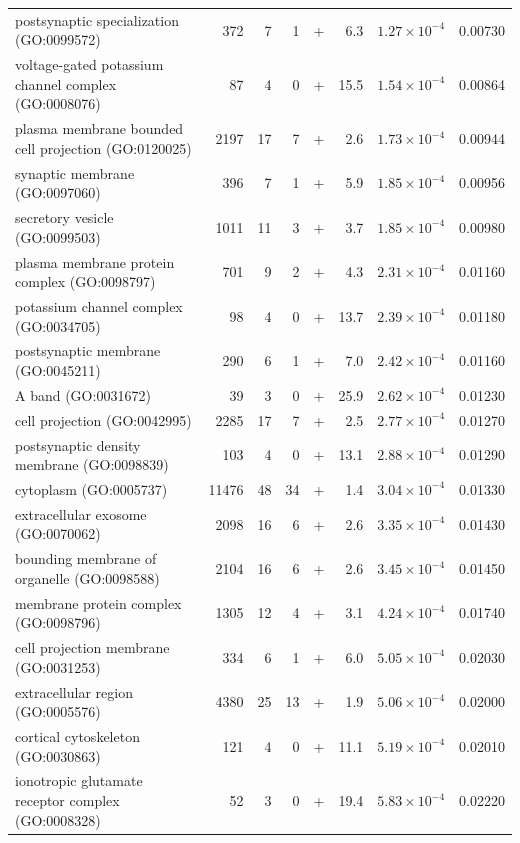 \begin{table}[ht]
\begin{adjustbox}{width=\textwidth}
\begin{tabular}{lrrrlrrr}
  postsynaptic specialization (GO:0099572) & 372 & 7 & 1 & + & 6.3 & $1.27 \times 10^{-4}$ & 0.00730 \\ 
  voltage-gated potassium channel complex (GO:0008076) & 87 & 4 & 0 & + & 15.5 & $1.54 \times 10^{-4}$ & 0.00864 \\ 
  plasma membrane bounded cell projection (GO:0120025) & 2197 & 17 & 7 & + & 2.6 & $1.73 \times 10^{-4}$ & 0.00944 \\ 
  synaptic membrane (GO:0097060) & 396 & 7 & 1 & + & 5.9 & $1.85 \times 10^{-4}$ & 0.00956 \\ 
  secretory vesicle (GO:0099503) & 1011 & 11 & 3 & + & 3.7 & $1.85 \times 10^{-4}$ & 0.00980 \\ 
  plasma membrane protein complex (GO:0098797) & 701 & 9 & 2 & + & 4.3 & $2.31 \times 10^{-4}$ & 0.01160 \\ 
  potassium channel complex (GO:0034705) & 98 & 4 & 0 & + & 13.7 & $2.39 \times 10^{-4}$ & 0.01180 \\ 
  postsynaptic membrane (GO:0045211) & 290 & 6 & 1 & + & 7.0 & $2.42 \times 10^{-4}$ & 0.01160 \\ 
  A band (GO:0031672) & 39 & 3 & 0 & + & 25.9 & $2.62 \times 10^{-4}$ & 0.01230 \\ 
  cell projection (GO:0042995) & 2285 & 17 & 7 & + & 2.5 & $2.77 \times 10^{-4}$ & 0.01270 \\ 
  postsynaptic density membrane (GO:0098839) & 103 & 4 & 0 & + & 13.1 & $2.88 \times 10^{-4}$ & 0.01290 \\ 
  cytoplasm (GO:0005737) & 11476 & 48 & 34 & + & 1.4 & $3.04 \times 10^{-4}$ & 0.01330 \\ 
  extracellular exosome (GO:0070062) & 2098 & 16 & 6 & + & 2.6 & $3.35 \times 10^{-4}$ & 0.01430 \\ 
  bounding membrane of organelle (GO:0098588) & 2104 & 16 & 6 & + & 2.6 & $3.45 \times 10^{-4}$ & 0.01450 \\ 
  membrane protein complex (GO:0098796) & 1305 & 12 & 4 & + & 3.1 & $4.24 \times 10^{-4}$ & 0.01740 \\ 
  cell projection membrane (GO:0031253) & 334 & 6 & 1 & + & 6.0 & $5.05 \times 10^{-4}$ & 0.02030 \\ 
  extracellular region (GO:0005576) & 4380 & 25 & 13 & + & 1.9 & $5.06 \times 10^{-4}$ & 0.02000 \\ 
  cortical cytoskeleton (GO:0030863) & 121 & 4 & 0 & + & 11.1 & $5.19 \times 10^{-4}$ & 0.02010 \\ 
  ionotropic glutamate receptor complex (GO:0008328) & 52 & 3 & 0 & + & 19.4 & $5.83 \times 10^{-4}$ & 0.02220 \\ 

\end{tabular}
\end{adjustbox}
\end{table}

